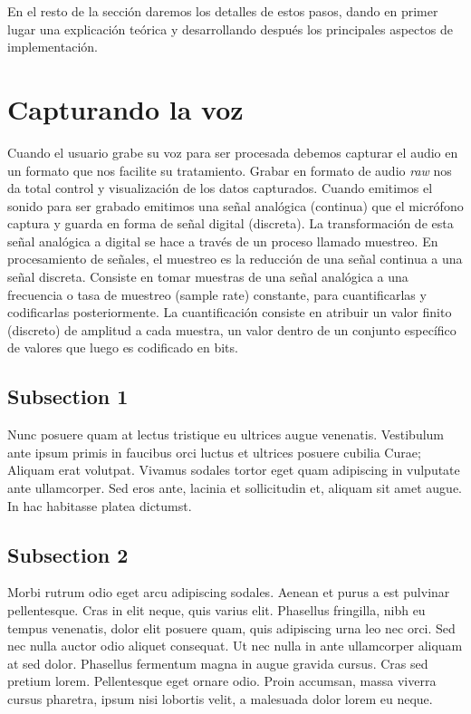 En el resto de la sección daremos los detalles de estos pasos, dando en primer lugar una explicación teórica y desarrollando después los principales aspectos de implementación.




\section{Capturando la voz}

Cuando el usuario grabe su voz para ser procesada debemos capturar el audio en un formato que nos facilite su tratamiento. Grabar en formato de audio \emph{raw} nos da total control y visualización de los datos capturados.
Cuando emitimos el sonido para ser grabado emitimos una señal analógica (continua) que el micrófono captura y guarda en forma de señal digital (discreta). 
La transformación de esta señal analógica a digital se hace a través de un proceso llamado muestreo.
En procesamiento de señales, el muestreo es la reducción de una señal continua a una señal discreta. Consiste en tomar muestras de una señal analógica a una frecuencia o tasa de muestreo (sample rate) constante, para cuantificarlas y codificarlas posteriormente. La cuantificación consiste en atribuir un valor finito (discreto) de amplitud a cada muestra, un valor dentro de un conjunto específico de valores que luego es codificado en bits.

\subsection{Subsection 1}

Nunc posuere quam at lectus tristique eu ultrices augue venenatis. Vestibulum ante ipsum primis in faucibus orci luctus et ultrices posuere cubilia Curae; Aliquam erat volutpat. Vivamus sodales tortor eget quam adipiscing in vulputate ante ullamcorper. Sed eros ante, lacinia et sollicitudin et, aliquam sit amet augue. In hac habitasse platea dictumst.


\subsection{Subsection 2}
Morbi rutrum odio eget arcu adipiscing sodales. Aenean et purus a est pulvinar pellentesque. Cras in elit neque, quis varius elit. Phasellus fringilla, nibh eu tempus venenatis, dolor elit posuere quam, quis adipiscing urna leo nec orci. Sed nec nulla auctor odio aliquet consequat. Ut nec nulla in ante ullamcorper aliquam at sed dolor. Phasellus fermentum magna in augue gravida cursus. Cras sed pretium lorem. Pellentesque eget ornare odio. Proin accumsan, massa viverra cursus pharetra, ipsum nisi lobortis velit, a malesuada dolor lorem eu neque.

